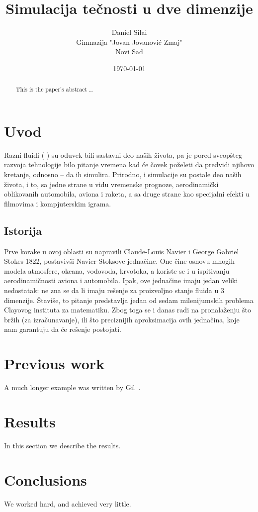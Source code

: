 \documentclass[12pt]{article}
\title{Simulacija te\v cnosti u dve dimenzije}
\author{
        Daniel Sila\dj i \\
        Gimnazija "Jovan Jovanovi\'{c} Zmaj"\\
		Novi Sad
}
\date{\today}
\begin{document}
\maketitle

\begin{abstract}
This is the paper's abstract \ldots
\end{abstract}

\section{Uvod}
Razni fluidi ( ) su oduvek bili sastavni deo na\v sih \v zivota, pa je pored sveop\v steg razvoja tehnologije bilo pitanje vremena kad \'ce \v covek po\v zeleti da predvidi njihovo kretanje, odnosno -- da ih simulira.
Prirodno, i simulacije su postale deo na\v sih \v zivota, i to, sa jedne strane u vidu vremenske prognoze, aerodinami\v cki oblikovanih automobila, aviona i raketa, a sa druge strane kao specijalni efekti u filmovima i kompjuterskim igrama.

\subsection{Istorija}
Prve korake u ovoj oblasti su napravili Claude-Louis Navier i George Gabriel Stokes 1822, postaviv\v si Navier-Stoksove jedna\v cine.
One \v cine osnovu mnogih modela atmosfere, okeana, vodovoda, krvotoka, a koriste se i u ispitivanju aerodinami\v cnosti aviona i automobila.
Ipak, ove jedna\v cine imaju jedan veliki nedostatak: ne zna se da li imaju re\v senje za proizvoljno stanje fluida u 3 dimenzije. 
\v Stavi\v se, to pitanje predstavlja jedan od sedam milenijumskih problema Clayovog instituta za matematiku. 
Zbog toga se i danas radi na pronala\v zenju \v sto br\v zih (za izra\v cunavanje), ili \v sto preciznijih aproksimacija ovih jedna\v cina, 
koje nam garantuju da \'ce re\v senje postojati.




\section{Previous work}\label{previous work}
A much longer \LaTeXe{} example was written by Gil~\cite{Gil:02}.

\section{Results}\label{results}
In this section we describe the results.

\section{Conclusions}\label{conclusions}
We worked hard, and achieved very little.



\end{document}

